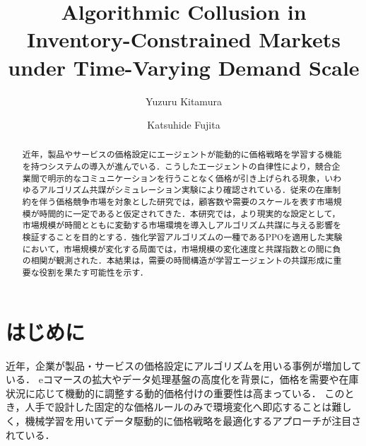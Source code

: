 \documentclass[runningheads]{llncs}
\begin{document}
%
%
\title{Algorithmic Collusion in Inventory-Constrained Markets under Time-Varying Demand Scale}
%
%
\author{Yuzuru Kitamura\and
Katsuhide Fujita}
%
%
\maketitle              %

\thispagestyle{empty} %
\pagestyle{empty}  

%
\begin{abstract}
近年，製品やサービスの価格設定にエージェントが能動的に価格戦略を学習する機能を持つシステムの導入が進んでいる．こうしたエージェントの自律性により，競合企業間で明示的なコミュニケーションを行うことなく価格が引き上げられる現象，いわゆるアルゴリズム共謀がシミュレーション実験により確認されている．従来の在庫制約を伴う価格競争市場を対象とした研究では，顧客数や需要のスケールを表す市場規模が時間的に一定であると仮定されてきた．本研究では，より現実的な設定として，市場規模が時間とともに変動する市場環境を導入しアルゴリズム共謀に与える影響を検証することを目的とする．強化学習アルゴリズムの一種であるPPOを適用した実験において，市場規模が変化する局面では，市場規模の変化速度と共謀指数との間に負の相関が観測された．本結果は，需要の時間構造が学習エージェントの共謀形成に重要な役割を果たす可能性を示す．

\end{abstract}
%
%
\section{はじめに}
近年，企業が製品・サービスの価格設定にアルゴリズムを用いる事例が増加している\cite{Chen2016}．
eコマースの拡大やデータ処理基盤の高度化を背景に，価格を需要や在庫状況に応じて機動的に調整する動的価格付けの重要性は高まっている．
このとき，人手で設計した固定的な価格ルールのみで環境変化へ即応することは難しく，機械学習を用いてデータ駆動的に価格戦略を最適化するアプローチが注目されている．
\end{document}
